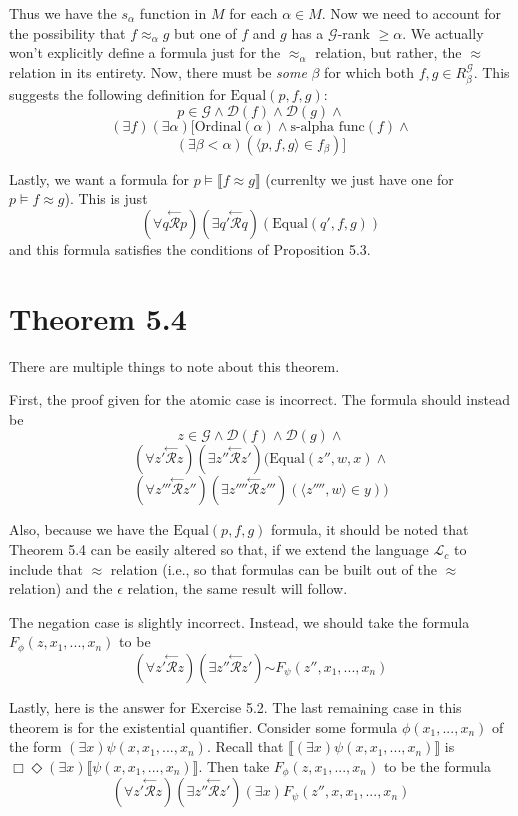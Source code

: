 \documentclass{article}
\newcommand*{\oldneg}{\mathord{\sim}}
\newcommand{\lbc}{\llbracket}
\newcommand{\rbc}{\rrbracket}
\newcommand{\ltop}[1]{\stackrel{\leftarrow}{#1}}
\theoremstyle{definition}
\begin{document}
Thus we have the $s_\alpha$ function in $M$ for each $\alpha\in M$. Now we need to account for the 
possibility that $f\approx_\alpha g$ but one of $f$ and $g$ has a $\mathcal{G}$-rank $\ge\alpha$. We actually 
won't explicitly define a formula just for the $\approx_\alpha$ relation, but rather, the $\approx$ relation 
in its entirety. Now, there must be \textit{some} $\beta$ for which both $f,g\in R^\mathcal{G}_\beta$. This 
suggests the following definition for $\textrm{Equal}(p,f,g)$:
\[ p\in\mathcal{G}\wedge\mathcal{D}(f)\wedge\mathcal{D}(g)\wedge \]
\[ (\exists f)(\exists\alpha)[\textrm{Ordinal}(\alpha)\wedge\textrm{s-alpha func}(f)\wedge \]
\[ (\exists\beta<\alpha)(\langle p,f,g\rangle\in f_\beta)] \]

Lastly, we want a formula for $p\vDash\lbc f\approx g\rbc$ (currenlty we just have one for 
$p\vDash f\approx g$). This is just
\[ (\forall q\ltop{\mathcal{R}}p)(\exists q'\ltop{\mathcal{R}}q)(\textrm{Equal}(q',f,g)) \]
and this formula satisfies the conditions of Proposition 5.3.

\section*{Theorem 5.4}
There are multiple things to note about this theorem.

First, the proof given for the atomic case is incorrect. The formula should instead be
\[ z\in\mathcal{G}\wedge\mathcal{D}(f)\wedge\mathcal{D}(g)\wedge \]
\[ (\forall z'\ltop{\mathcal{R}}z)(\exists z''\ltop{\mathcal{R}}z')(\textrm{Equal}(z'',w,x)\wedge \]
\[ (\forall z'''\ltop{\mathcal{R}}z'')(\exists z''''\ltop{\mathcal{R}}z''')(\langle z'''',w\rangle\in y)) \]

Also, because we have the $\textrm{Equal}(p,f,g)$ formula, it should be noted that 
Theorem 5.4 can be easily altered so that, if we extend the language $\mathcal{L}_c$ to include that 
$\approx$ relation (i.e., so that formulas can be built out of the $\approx$ relation) and the $\epsilon$ relation, 
the same result will follow.

The negation case is slightly incorrect. Instead, we should take the formula 
$F_\phi(z,x_1,...,x_n)$ to be
\[ (\forall z'\ltop{\mathcal{R}}z)(\exists z''\ltop{\mathcal{R}}z')\oldneg F_\psi(z'',x_1,...,x_n) \]

Lastly, here is the answer for Exercise 5.2. The last remaining case in this theorem is for the existential quantifier. Consider 
some formula $\phi(x_1,...,x_n)$ of the form $(\exists x)\psi(x,x_1,...,x_n)$. Recall that 
$\lbc(\exists x)\psi(x,x_1,...,x_n)\rbc$ is $\Box\Diamond(\exists x)\lbc\psi(x,x_1,...,x_n)\rbc$. Then take 
$F_\phi(z,x_1,...,x_n)$ to be the formula
\[ (\forall z'\ltop{\mathcal{R}}z)(\exists z''\ltop{\mathcal{R}}z')(\exists x)F_\psi(z'',x,x_1,...,x_n) \]
\end{document}

